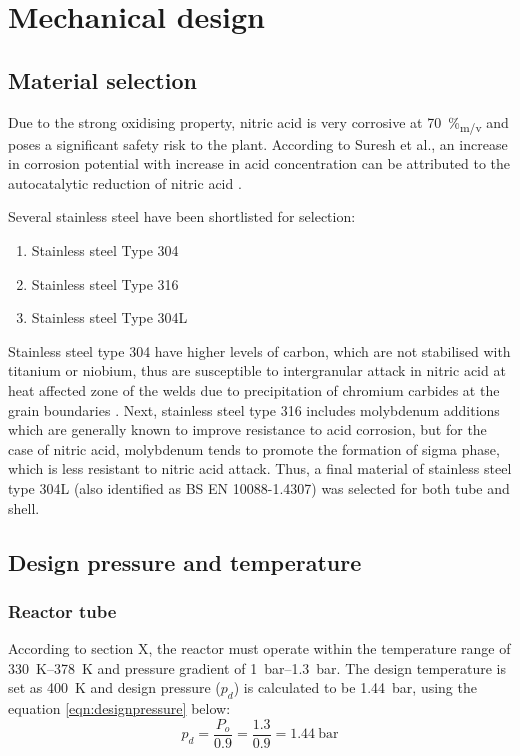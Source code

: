 \section{Mechanical design}
\subsection{Material selection}
Due to the strong oxidising property, nitric acid is very corrosive at \SI{70}{\%_{m/v}} and poses a significant safety risk to the plant. According to Suresh et al., an increase in corrosion potential with increase in acid concentration can be attributed to the autocatalytic reduction of nitric acid \cite{suresh_corrosion_nodate}. 

Several stainless steel have been shortlisted for selection: 
\begin{enumerate}
    \item Stainless steel Type 304
    \item Stainless steel Type 316
    \item Stainless steel Type 304L
\end{enumerate}

Stainless steel type 304 have higher levels of carbon, which are not stabilised with titanium or niobium, thus are susceptible to intergranular attack in nitric acid at heat affected zone of the welds due to precipitation of chromium carbides at the grain boundaries \cite{cm_selection_nodate} . Next, stainless steel type 316 includes molybdenum additions which are generally known to improve resistance to acid corrosion, but for the case of nitric acid, molybdenum tends to promote the formation of sigma phase, which is less resistant to nitric acid attack. Thus, a final material of stainless steel type 304L (also identified as BS EN 10088-1.4307) was selected for both tube and shell.

\subsection{Design pressure and temperature}
\subsubsection{Reactor tube}
According to section X, the reactor must operate within the temperature range of \SIrange{330}{378}{\K} and pressure gradient of \SIrange{1}{1.3}{\bar}. The design temperature is set as \SI{400}{\K} and design pressure ($p_d$) is calculated to be \SI{1.44}{\bar}, using the equation \ref{eqn:designpressure} below:
\begin{equation}
    p_d = \frac{P_o}{0.9} = \frac{1.3}{0.9} = \SI{1.44}{\bar}
    \label{eqn:designpressure}
\end{equation}
